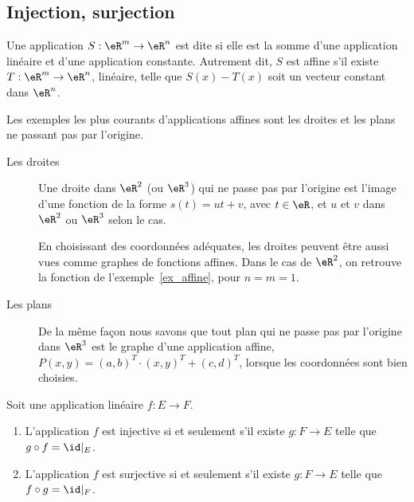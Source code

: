 \subsection{Injection, surjection}

\begin{definition}
  Une application $S: \eR^m\to\eR^n$ est dite  si elle est la somme d'une application linéaire et d'une application constante. Autrement dit, $S$ est affine s'il existe $T: \eR^m\to\eR^n$, linéaire, telle que $S(x)-T(x)$ soit un vecteur constant dans $\eR^n$.
\end{definition}

\begin{example}     \label{EXooSUTAooEaQCuZ}
	Les exemples les plus courants d'applications affines sont les droites et les plans ne passant pas par l'origine.
	\begin{description}
		\item[Les droites] Une droite dans $\eR^2$ (ou $\eR^3$) qui ne passe pas par l'origine est l'image d'une fonction de la forme $s(t) =u t +v$, avec $t \in \eR$, et $u$ et $v$ dans $\eR^2$ ou $\eR^3$ selon le cas. 

		En choisissant des coordonnées adéquates, les droites peuvent être aussi vues comme graphes de fonctions affines. Dans le cas de $\eR^2$, on retrouve la fonction de l'exemple~\ref{ex_affine}, pour \( n = m = 1 \).

		\item[Les plans]
			De la même façon nous savons que tout plan qui ne passe pas par l'origine dans $\eR^3$ est le graphe d'une application affine, $P(x,y)= (a,b)^T\cdot(x,y)^T+(c,d)^T$, lorsque les coordonnées sont bien choisies.
	\end{description}
\end{example}

\begin{lemma}        \label{LEMooDAACooElDsYb}
    Soit une application linéaire \( f\colon E\to F\).
    \begin{enumerate}
        \item       \label{ITEMooEZEWooZGoqsZ}
            L'application \( f\) est injective si et seulement s'il existe \( g\colon F\to E\) telle que \( g\circ f=\id|_E\).
        \item
            L'application \( f\) est surjective si et seulement s'il existe \( g\colon F\to E\) telle que \( f\circ g=\id|_F\).
    \end{enumerate}
\end{lemma}

